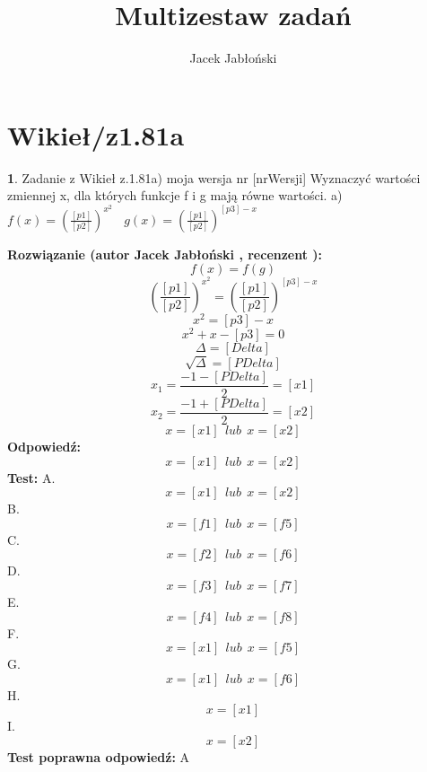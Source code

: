 \documentclass[12pt, a4paper]{article}
\title{Multizestaw zadań}
\author{Jacek Jabłoński}
\date{}
\theoremstyle{definition} %
\newtheorem{zad}{}
\newcommand{\kategoria}[1]{\section{#1}} %
\newcommand{\zadStart}[1]{\begin{zad}#1\newline} %
\newcommand{\zadStop}{\end{zad}}   %
\newcommand{\rozwStart}[2]{\noindent \textbf{Rozwiązanie (autor #1 , recenzent #2): }\newline} %
\newcommand{\rozwStop}{\newline}                                            %
\newcommand{\odpStart}{\noindent \textbf{Odpowiedź:}\newline}    %
\newcommand{\odpStop}{\newline}                                             %
\newcommand{\testStart}{\noindent \textbf{Test:}\newline} %
\newcommand{\testStop}{\newline} %
\newcommand{\kluczStart}{\noindent \textbf{Test poprawna odpowiedź:}\newline} %
\newcommand{\kluczStop}{\newline} %
\begin{document}
\maketitle


\kategoria{Wikieł/z1.81a}
\zadStart{Zadanie z Wikieł z.1.81a) moja wersja nr [nrWersji]}
Wyznaczyć wartości zmiennej x, dla których funkcje f i g mają równe wartości.
a)$f(x)=(\frac{[p1]}{[p2]})^{x^2} \ \ \ \ g(x)=(\frac{[p1]}{[p2]})^{[p3]-x}$
\zadStop
\rozwStart{Jacek Jabłoński}{}
$$f(x)=f(g)$$
$$(\frac{[p1]}{[p2]})^{x^2} = (\frac{[p1]}{[p2]})^{[p3]-x}$$
$$x^2 = [p3]-x$$
$$x^2 + x - [p3] = 0$$
$$\Delta = [Delta] $$
$$\sqrt{\Delta} = [PDelta] $$
$$x_1 = \frac{-1-[PDelta]}{2} = [x1] $$
$$x_2 = \frac{-1+[PDelta]}{2} = [x2] $$
$$x = [x1] \ \ lub \ \ x = [x2]$$
\rozwStop
\odpStart
$$x = [x1] \ \ lub \ \ x = [x2]$$
\odpStop
\testStart
A. $$x = [x1] \ \ lub \ \ x = [x2]$$
B. $$x = [f1] \ \ lub \ \ x = [f5]$$
C. $$x = [f2] \ \ lub \ \ x = [f6]$$
D. $$x = [f3] \ \ lub \ \ x = [f7]$$
E. $$x = [f4] \ \ lub \ \ x = [f8]$$
F. $$x = [x1] \ \ lub \ \ x = [f5]$$
G. $$x = [x1] \ \ lub \ \ x = [f6]$$
H. $$x = [x1]$$
I. $$x = [x2]$$
\testStop
\kluczStart
A
\kluczStop
\end{document}

